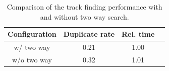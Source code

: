 
\begin{table}[ht]
    \centering
    \begin{tabular}{cccc}
        \hline
        \textbf{Configuration} & \textbf{Duplicate rate} & \textbf{Rel. time} \\
        \hline
        w/ two way  & 0.21 & 1.00 \\
        w/o two way & 0.32 & 1.01 \\
        \hline
    \end{tabular}
    \caption{Comparison of the track finding performance with and without two way search.}
    \label{tab:dev/trackfinding/two-way}
\end{table}
